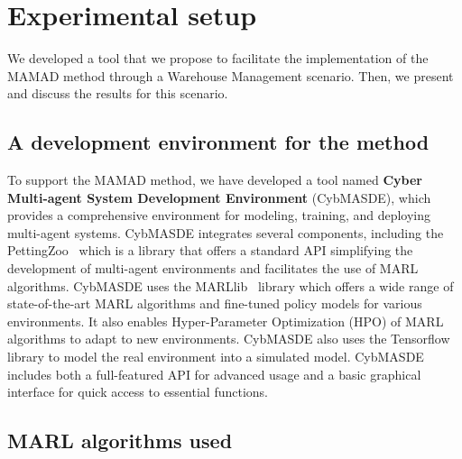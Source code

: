 \documentclass[pdflatex,sn-mathphys-num]{sn-jnl}%
\theoremstyle{thmstyleone}%
\theoremstyle{thmstyletwo}%
\theoremstyle{thmstylethree}%
\begin{document}
\section{Experimental setup}
\label{sec:experimental_setup}

We developed a tool that we propose to facilitate the implementation of the MAMAD method through a Warehouse Management scenario. Then, we present and discuss the results for this scenario.

\subsection{A development environment for the method}

To support the MAMAD method, we have developed a tool named \textbf{Cyber Multi-agent System Development Environment} (CybMASDE), which provides a comprehensive environment for modeling, training, and deploying multi-agent systems. CybMASDE integrates several components, including the PettingZoo~\cite{Terry2021} which is a library that offers a standard API simplifying the development of multi-agent environments and facilitates the use of MARL algorithms. CybMASDE uses the MARLlib~\cite{hu2022marllib} library which offers a wide range of state-of-the-art MARL algorithms and fine-tuned policy models for various environments. It also enables Hyper-Parameter Optimization (HPO) of MARL algorithms to adapt to new environments. CybMASDE also uses the Tensorflow library to model the real environment into a simulated model. CybMASDE includes both a full-featured API for advanced usage and a basic graphical interface for quick access to essential functions.


\subsection{MARL algorithms used}
\end{document}
